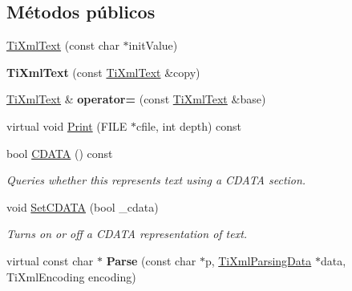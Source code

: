 \subsection*{Métodos públicos}
\begin{DoxyCompactItemize}
\item 
\hyperlink{class_ti_xml_text_af659e77c6b87d684827f35a8f4895960}{Ti\-Xml\-Text} (const char $\ast$init\-Value)
\item 
\hypertarget{class_ti_xml_text_a8d2cc1b4af2208cbb0171cf20f6815d1}{{\bfseries Ti\-Xml\-Text} (const \hyperlink{class_ti_xml_text}{Ti\-Xml\-Text} \&copy)}\label{class_ti_xml_text_a8d2cc1b4af2208cbb0171cf20f6815d1}

\item 
\hypertarget{class_ti_xml_text_aed5b13f9c1b804c616fd533882c29f57}{\hyperlink{class_ti_xml_text}{Ti\-Xml\-Text} \& {\bfseries operator=} (const \hyperlink{class_ti_xml_text}{Ti\-Xml\-Text} \&base)}\label{class_ti_xml_text_aed5b13f9c1b804c616fd533882c29f57}

\item 
virtual void \hyperlink{class_ti_xml_text_ae74d56c5b3ddec6cc3103dd51821af92}{Print} (F\-I\-L\-E $\ast$cfile, int depth) const 
\item 
\hypertarget{class_ti_xml_text_ad1a6a6b83fa2271022dd97c072a2b586}{bool \hyperlink{class_ti_xml_text_ad1a6a6b83fa2271022dd97c072a2b586}{C\-D\-A\-T\-A} () const }\label{class_ti_xml_text_ad1a6a6b83fa2271022dd97c072a2b586}

\begin{DoxyCompactList}\small\item\em Queries whether this represents text using a C\-D\-A\-T\-A section. \end{DoxyCompactList}\item 
\hypertarget{class_ti_xml_text_acb17ff7c5d09b2c839393445a3de5ea9}{void \hyperlink{class_ti_xml_text_acb17ff7c5d09b2c839393445a3de5ea9}{Set\-C\-D\-A\-T\-A} (bool \-\_\-cdata)}\label{class_ti_xml_text_acb17ff7c5d09b2c839393445a3de5ea9}

\begin{DoxyCompactList}\small\item\em Turns on or off a C\-D\-A\-T\-A representation of text. \end{DoxyCompactList}\item 
\hypertarget{class_ti_xml_text_a8d2dcfa41fc73d3e62dacc2fcf633819}{virtual const char $\ast$ {\bfseries Parse} (const char $\ast$p, \hyperlink{class_ti_xml_parsing_data}{Ti\-Xml\-Parsing\-Data} $\ast$data, Ti\-Xml\-Encoding encoding)}\label{class_ti_xml_text_a8d2dcfa41fc73d3e62dacc2fcf633819}


\end{DoxyCompactItemize}
